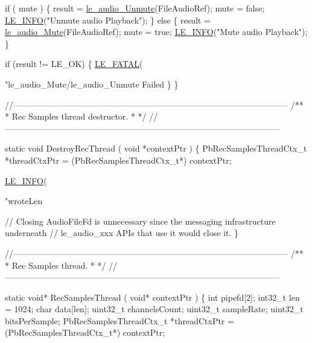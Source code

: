 \begin{DoxyCodeInclude}
{{{    \textcolor{keywordflow}{if} ( mute )
    \{
        result = \hyperlink{le__audio__interface_8h_adad24547293481964039efe56bc14e2b}{le\_audio\_Unmute}(FileAudioRef);
        mute = \textcolor{keyword}{false};
        \hyperlink{le__log_8h_a23e6d206faa64f612045d688cdde5808}{LE\_INFO}(\textcolor{stringliteral}{"Unmute audio Playback"});
    \}
    \textcolor{keywordflow}{else}
    \{
        result = \hyperlink{le__audio__interface_8h_a147e97c49dbc003f63df78f97d5fca32}{le\_audio\_Mute}(FileAudioRef);
        mute = \textcolor{keyword}{true};
        \hyperlink{le__log_8h_a23e6d206faa64f612045d688cdde5808}{LE\_INFO}(\textcolor{stringliteral}{"Mute audio Playback"});
    \}

    \textcolor{keywordflow}{if} (result != LE\_OK)
    \{
        \hyperlink{le__log_8h_a54b4b07f5396e19a8d9fca74238f4795}{LE\_FATAL}(\textcolor{stringliteral}{"le\_audio\_Mute/le\_audio\_Unmute Failed %
    \}
\}

\textcolor{comment}{//--------------------------------------------------------------------------------------------------}\textcolor{comment}{}
\textcolor{comment}{/**}
\textcolor{comment}{ * Rec Samples thread destructor.}
\textcolor{comment}{ *}
\textcolor{comment}{ */}
\textcolor{comment}{//--------------------------------------------------------------------------------------------------}

\textcolor{keyword}{static} \textcolor{keywordtype}{void} DestroyRecThread
(
    \textcolor{keywordtype}{void} *contextPtr
)
\{
    PbRecSamplesThreadCtx\_t *threadCtxPtr = (PbRecSamplesThreadCtx\_t*) contextPtr;

    \hyperlink{le__log_8h_a23e6d206faa64f612045d688cdde5808}{LE\_INFO}(\textcolor{stringliteral}{"wroteLen %

    \textcolor{comment}{// Closing AudioFileFd is unnecessary since the messaging infrastructure underneath}
    \textcolor{comment}{// le\_audio\_xxx APIs that use it would close it.}
\}

\textcolor{comment}{//--------------------------------------------------------------------------------------------------}\textcolor{comment}{}
\textcolor{comment}{/**}
\textcolor{comment}{ * Rec Samples thread.}
\textcolor{comment}{ *}
\textcolor{comment}{ */}
\textcolor{comment}{//--------------------------------------------------------------------------------------------------}

\textcolor{keyword}{static} \textcolor{keywordtype}{void}* RecSamplesThread
(
    \textcolor{keywordtype}{void}* contextPtr
)
\{
    \textcolor{keywordtype}{int} pipefd[2];
    int32\_t len = 1024;
    \textcolor{keywordtype}{char} data[len];
    uint32\_t channelsCount;
    uint32\_t sampleRate;
    uint32\_t bitsPerSample;
    PbRecSamplesThreadCtx\_t *threadCtxPtr = (PbRecSamplesThreadCtx\_t*) contextPtr;

}}}}}
\end{DoxyCodeInclude}
